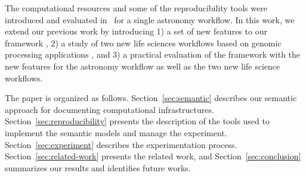
The  computational resources and some of the reproducibility tools were introduced and evaluated in~\cite{SantanaPerez-REPPAR-2014} for a single astronomy  
workflow. In this work, we extend our previous work by introducing 1) a set 
of new features to our framework , 2) a study of two new life sciences workflows based on genomic processing applications , and 3) a practical evaluation 
of the framework with the new features for the astronomy workflow as well as the two new 
life science workflows. 


The paper is organized as follows. Section~\ref{sec:semantic} describes our semantic approach 
for documenting computational infrastructures. Section~\ref{sec:reproducibility} presents the 
description of the tools used to implement the semantic models and manage the experiment. 
Section~\ref{sec:experiment} describes the experimentation process. Section~\ref{sec:related-work} 
presents the related work, and Section~\ref{sec:conclusion} summarizes our results and 
identifies future works.


